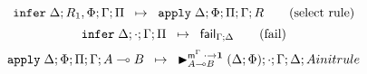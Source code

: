 \[
\mathtt{infer} \; \Delta; R_1, \Phi; \Gamma; \Pi \;\; \mapsto \;\; \mathtt{apply} \; \Delta; \Phi; \Pi; \Gamma; R \tag{select rule}
\]
\[
\mathtt{infer} \; \Delta; \cdot; \Gamma; \Pi \;\; \mapsto \;\; \mathsf{fail}_{\Gamma; \Delta} \tag{fail}
\]
\[
\mathtt{apply} \; \Delta; \Phi; \Pi; \Gamma; A \multimap B \;\; \mapsto \;\; {\blacktriangleright}_{A \multimap B}^{\mathsf{m}^\Gamma \; \cdot \rightarrow
                                                            \mathbf{1}} \; (\Delta; \Phi); \cdot; \Gamma; \Delta; A {init rule}
\]
